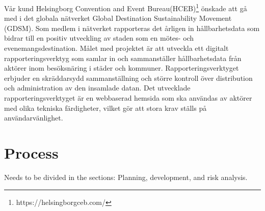 \documentclass[12pt]{article}
\begin{document}
Vår kund Helsingborg Convention and Event Bureau(HCEB)\footnote{https://helsingborgceb.com/} önskade att gå med i det globala nätverket Global Destination Sustainability Movement (GDSM). Som medlem i nätverket rapporteras det årligen in hållbarhetsdata som bidrar till en positiv utveckling av staden som en mötes- och evenemangsdestination. Målet med projektet är att utveckla ett digitalt rapporteringsverktyg som samlar in och sammanställer hållbarhetsdata från aktörer inom besöksnäring i städer och kommuner. Rapporteringsverktyget erbjuder en skräddarsydd sammanställning och större kontroll över distribution och administration av den insamlade datan. Det utvecklade rapporteringsverktyget är en webbaserad hemsida som ska användas av aktörer med olika tekniska färdigheter, vilket gör att stora krav ställs på användarvänlighet.







\section{Process}
Needs to be divided in the sections: Planning, development, and risk analysis.
\end{document}
